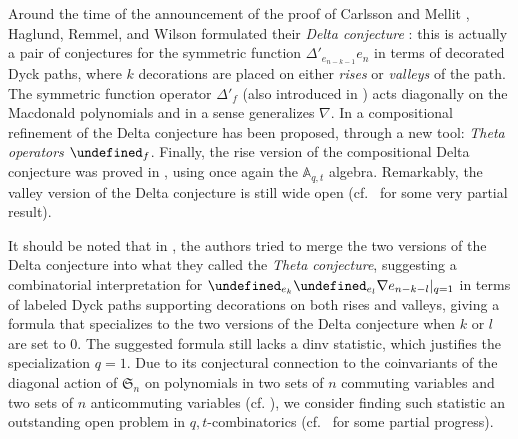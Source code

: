 \documentclass[reqno]{amsart}
\theoremstyle{plain}
\theoremstyle{definition}
\theoremstyle{remark}
\newcommand{\A}{\mathbb{A}}%
\let\oldTheta\Theta
\let\Theta\undefined
\DeclareMathOperator{\Theta}{\oldTheta}
\newcommand{\<}{\langle}
\renewcommand{\>}{\rangle}
\begin{document}
Around the time of the announcement of the proof of Carlsson and Mellit \cite{CarlssonMellit2018ShuffleConjecture}, Haglund, Remmel, and Wilson formulated their \emph{Delta conjecture} \cite{HaglundRemmelWilson2018DeltaConjecture}: this is actually a pair of conjectures for the symmetric function $\Delta'_{e_{n-k-1}}e_n$ in terms of decorated Dyck paths, where $k$ decorations are placed on either \emph{rises} or \emph{valleys} of the path. The symmetric function operator $\Delta'_f$ (also introduced in \cite{BergeronGarsiaHaimanTesler1999IdentitiesPositivityConjectures}) acts diagonally on the Macdonald polynomials and in a sense generalizes $\nabla$. In \cite{DAdderioIraciVandenWyngaerd2021ThetaOperators} a compositional refinement of the Delta conjecture has been proposed, through a new tool: \emph{Theta operators} $\Theta_f$. Finally, the rise version of the compositional Delta conjecture was proved in \cite{DAdderioMellit2022CompositionalDelta}, using once again the $\A_{q,t}$ algebra. Remarkably, the valley version of the Delta conjecture is still wide open (cf.\ \cite{DAdderioIraci2023} for some very partial result).

It should be noted that in \cite[Conjecture~9.1]{DAdderioIraciVandenWyngaerd2021ThetaOperators}, the authors tried to merge the two versions of the Delta conjecture into what they called the \emph{Theta conjecture}, suggesting a combinatorial interpretation for $\Theta_{e_k} \Theta_{e_l} \nabla e_{n-k-l}|_{q=1}$ in terms of labeled Dyck paths supporting decorations on both rises and valleys, giving a formula that specializes to the two versions of the Delta conjecture when $k$ or $l$ are set to $0$. The suggested formula still lacks a dinv statistic, which justifies the specialization $q=1$. Due to its conjectural connection to the coinvariants of the diagonal action of $\mathfrak{S}_n$ on polynomials in two sets of $n$ commuting variables and two sets of $n$ anticommuting variables (cf. \cite[Section 8]{DAdderioIraciVandenWyngaerd2021ThetaOperators}), we consider finding such statistic an outstanding open problem in $q,t$-combinatorics (cf.\ \cite{IraciNadeauVandenWyngaerd2024Smirnov} for some partial progress).
\end{document}

